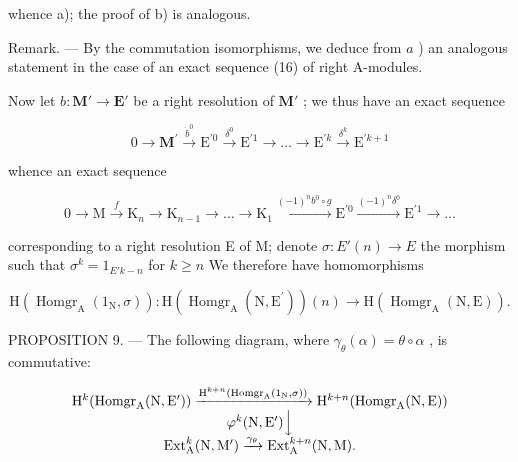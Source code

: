 whence a); the proof of b) is analogous.

Remark. --- By the commutation isomorphisms, we deduce from \(a\) ) an analogous statement in the case of an exact sequence (16) of right A-modules.

Now let \(b: \mathbf{M}' \to \mathbf{E}'\) be a right resolution of \(\mathbf{M}'\) ; we thus have an exact sequence

\[
0 \rightarrow \mathbf {M} ^ {\prime} \xrightarrow {\dot {b} ^ {0}} \mathrm{E} ^ {\prime 0} \xrightarrow {\delta^ {0}} \mathrm{E} ^ {\prime 1} \rightarrow \dots \rightarrow \mathrm{E} ^ {\prime k} \xrightarrow {\delta^ {k}} \mathrm{E} ^ {\prime k + 1}
\]

whence an exact sequence

\[
0 \rightarrow \mathrm{M} \xrightarrow {f} \mathrm{K} _ {n} \rightarrow \mathrm{K} _ {n - 1} \rightarrow \dots \rightarrow \mathrm{K} _ {1} \xrightarrow {(- 1) ^ {n} b ^ {0} \circ g} \mathrm{E} ^ {\prime 0} \xrightarrow {(- 1) ^ {n} \delta^ {0}} \mathrm{E} ^ {\prime 1} \rightarrow \dots
\]

corresponding to a right resolution E of M; denote \(\sigma : E'(n) \to E\) the morphism such that \(\sigma^k = 1_{E'k - n}\) for \(k \geqslant n\) We therefore have homomorphisms

\[
\mathrm{H} \left(\operatorname{Homgr} _ {\mathrm{A}} \left(1 _ {\mathrm{N}}, \sigma\right)\right): \mathrm{H} \left(\operatorname{Homgr} _ {\mathrm{A}} \left(\mathrm{N}, \mathrm{E} ^ {\prime}\right)\right) (n) \rightarrow \mathrm{H} \left(\operatorname{Homgr} _ {\mathrm{A}} (\mathrm{N}, \mathrm{E})\right).
\]

PROPOSITION 9. --- The following diagram, where \(\gamma_{\theta}(\alpha) = \theta \circ \alpha\) , is commutative:

\[
\begin{array}{c} \mathrm{H} ^ {k} (\text {Homgr} _ {\mathrm{A}} (\mathrm{N}, \mathrm{E} ^ {\prime})) \xrightarrow {\mathrm{H} ^ {k + n} (\text {Homgr} _ {\mathrm{A}} (1 _ {\mathrm{N}} , \sigma))} \mathrm{H} ^ {k + n} (\text {Homgr} _ {\mathrm{A}} (\mathrm{N}, \mathrm{E})) \\ \varphi^ {k} (\mathrm{N}, \mathrm{E} ^ {\prime}) \Big \downarrow \\ \operatorname{Ext} _ {\mathrm{A}} ^ {k} (\mathrm{N}, \mathrm{M} ^ {\prime}) \xrightarrow {\gamma_ {\theta}} \operatorname{Ext} _ {\mathrm{A}} ^ {k + n} (\mathrm{N}, \mathrm{M}). \end{array}
\]

